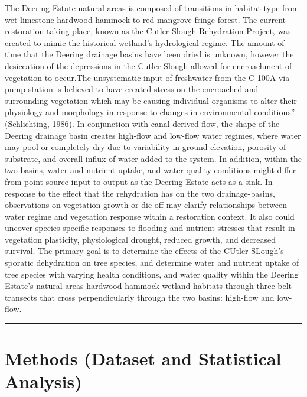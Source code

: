 \documentclass[
]{article}
\begin{document}
The Deering Estate natural areas is composed of transitions in habitat
type from wet limestone hardwood hammock to red mangrove fringe forest.
The current restoration taking place, known as the Cutler Slough
Rehydration Project, was created to mimic the historical wetland's
hydrological regime. The amount of time that the Deering drainage basins
have been dried is unknown, however the desiccation of the depressions
in the Cutler Slough allowed for encroachment of vegetation to occur.The
unsystematic input of freshwater from the C-100A via pump station is
believed to have created stress on the encroached and surrounding
vegetation which may be causing individual organisms to alter their
physiology and morphology in response to changes in environmental
conditions'' (Schlichting, 1986). In conjunction with canal-derived
flow, the shape of the Deering drainage basin creates high-flow and
low-flow water regimes, where water may pool or completely dry due to
variability in ground elevation, porosity of substrate, and overall
influx of water added to the system. In addition, within the two basins,
water and nutrient uptake, and water quality conditions might differ
from point source input to output as the Deering Estate acts as a sink.
In response to the effect that the rehydration has on the two
drainage-basins, observations on vegetation growth or die-off may
clarify relationships between water regime and vegetation response
within a restoration context. It also could uncover species-specific
responses to flooding and nutrient stresses that result in vegetation
plasticity, physiological drought, reduced growth, and decreased
survival. The primary goal is to determine the effects of the CUtler
SLough's sporatic dehydration on tree species, and determine water and
nutrient uptake of tree species with varying health conditions, and
water quality within the Deering Estate's natural areas hardwood hammock
wetland habitats through three belt transects that cross perpendicularly
through the two basins: high-flow and low-flow.

\begin{center}\rule{0.5\linewidth}{\linethickness}\end{center}

\hypertarget{methods-dataset-and-statistical-analysis}{%
\section{Methods (Dataset and Statistical
Analysis)}\label{methods-dataset-and-statistical-analysis}}
\end{document}

